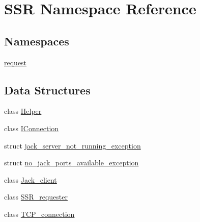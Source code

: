 \hypertarget{namespaceSSR}{\section{S\-S\-R Namespace Reference}
\label{namespaceSSR}
}
\subsection*{Namespaces}
\begin{DoxyCompactItemize}
\item 
\hyperlink{namespaceSSR_1_1request}{request}
\end{DoxyCompactItemize}
\subsection*{Data Structures}
\begin{DoxyCompactItemize}
\item 
class \hyperlink{classSSR_1_1Helper}{Helper}
\item 
class \hyperlink{classSSR_1_1IConnection}{I\-Connection}
\item 
struct \hyperlink{structSSR_1_1jack__server__not__running__exception}{jack\-\_\-server\-\_\-not\-\_\-running\-\_\-exception}
\item 
struct \hyperlink{structSSR_1_1no__jack__ports__available__exception}{no\-\_\-jack\-\_\-ports\-\_\-available\-\_\-exception}
\item 
class \hyperlink{classSSR_1_1Jack__client}{Jack\-\_\-client}
\item 
class \hyperlink{classSSR_1_1SSR__requester}{S\-S\-R\-\_\-requester}
\item 
class \hyperlink{classSSR_1_1TCP__connection}{T\-C\-P\-\_\-connection}
\end{DoxyCompactItemize}

